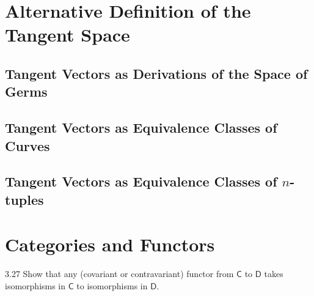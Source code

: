 \section{Alternative Definition of the Tangent Space}

\subsection{Tangent Vectors as Derivations of the Space of Germs}

\subsection{Tangent Vectors as Equivalence Classes of Curves}

\subsection{Tangent Vectors as Equivalence Classes of \(n\)-tuples}

\section{Categories and Functors}

\begin{exercise}{3.27}
    Show that any (covariant or contravariant) functor from \( \mathsf{C} \) to \( \mathsf{D} \) takes isomorphisms in \( \mathsf{C} \) to isomorphisms in \( \mathsf{D} \).
\end{exercise}

